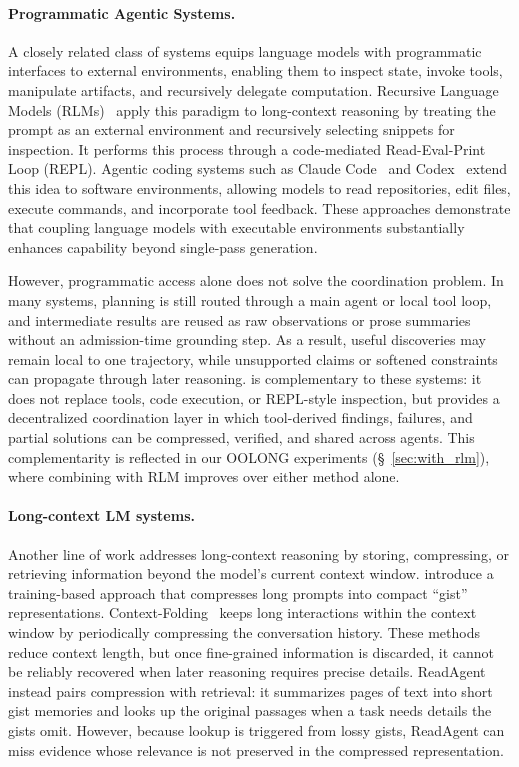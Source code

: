 \paragraph{Programmatic Agentic Systems.}
A closely related class of systems equips language models with programmatic interfaces to external environments, enabling them to inspect state, invoke tools, manipulate artifacts, and recursively delegate computation. Recursive Language Models (RLMs)~\citep{zhang2025recursive} apply this paradigm to long-context reasoning by treating the prompt as an external environment and recursively selecting snippets for inspection. It performs this process through a code-mediated Read-Eval-Print Loop (REPL). Agentic coding systems such as Claude Code~\citep{anthropic_claude_code_2026} and Codex~\citep{openai_codex_2025} extend this idea to software environments, allowing models to read repositories, edit files, execute commands, and incorporate tool feedback. These approaches demonstrate that coupling language models with executable environments substantially enhances capability beyond single-pass generation. 

However, programmatic access alone does not solve the coordination problem. In many systems, planning is still routed through a main agent or local tool loop, and intermediate results are reused as raw observations or prose summaries without an admission-time grounding step. As a result, useful discoveries may remain local to one trajectory, while unsupported claims or softened constraints can propagate through later reasoning. \toolName{} is complementary to these systems: it does not replace tools, code execution, or REPL-style inspection, but provides a decentralized coordination layer in which tool-derived findings, failures, and partial solutions can be compressed, verified, and shared across agents. This complementarity is reflected in our OOLONG experiments (\S~\ref{sec:with_rlm}), where combining \toolName{} with RLM improves over either method alone.

\paragraph{Long-context LM systems.}
Another line of work addresses long-context reasoning by storing, compressing, or retrieving information beyond the model's current context window. \citet{mu2023learning} introduce a training-based approach that compresses long prompts into compact ``gist'' representations. Context-Folding~\citep{sun2025scaling} keeps long interactions within the context window by periodically compressing the conversation history. These methods reduce context length, but once fine-grained information is discarded, it cannot be reliably recovered when later reasoning requires precise details. ReadAgent~\citep{lee2024human} instead pairs compression with retrieval: it summarizes pages of text into short gist memories and looks up the original passages when a task needs details the gists omit. However, because lookup is triggered from lossy gists, ReadAgent can miss evidence whose relevance is not preserved in the compressed representation. 

